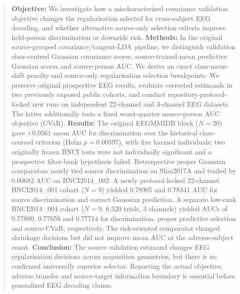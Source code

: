 \begin{abstract}
\textbf{Objective:} We investigate how a
mischaracterized covariance validation
objective changes the regularisation
selected for cross-subject EEG decoding,
and whether alternative source-only
selection criteria improve held-person
discrimination or downside risk.
\textbf{Methods:} In the original
source-grouped covariance/tangent-LDA
pipeline, we distinguish validation
class-centred Gaussian covariance
scores, source-trained-mean predictive
Gaussian scores and source-person
AUC. We derive an exact class-mean-shift
penalty and source-only regularisation
selection breakpoints. We preserve
original prospective EEG results,
evaluate corrected estimands in two
previously exposed public cohorts,
and conduct repository-protocol-locked
new runs on independent 22-channel and
3-channel EEG datasets. The latter
additionally tests a fixed worst-quarter
source-person AUC objective (CVaR).
\textbf{Results:} The original EEGMMIDB
block ($N=20$) gave $+0.0561$ mean AUC
for discrimination over the historical
class-centred criterion
(Holm $p=0.00597$), with five harmed
individuals; two originally frozen
BNCI tests were not individually
significant and a prospective
filter-bank hypothesis failed.
Retrospective proper Gaussian
comparators nearly tied source
discrimination on Shin2017A and
trailed by 0.00682 AUC on
BNCI2014\_002. A newly protocol-locked
22-channel BNCI2014\_001 cohort
($N=9$) yielded 0.78905 and 0.78341
AUC for source discrimination and
correct Gaussian prediction.
A separate low-rank BNCI2014\_004
cohort ($N=9$, 6,520 trials,
3 channels) yielded AUCs of
0.77800, 0.77658 and 0.77714
for discrimination, proper predictive
selection and source-CVaR, respectively.
The risk-oriented comparator changed
shrinkage decisions but did not improve
mean AUC or the adverse-subject count.
\textbf{Conclusion:} The source
validation estimand changes EEG
regularisation decisions across
acquisition geometries, but there
is no confirmed universally superior
selector. Reporting the actual
objective, adverse transfer and
source-target information boundary
is essential before generalized
EEG decoding claims.
\end{abstract}
